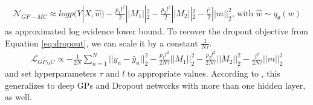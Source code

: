 \documentclass[a4paper,cleardoubleempty,BCOR1cm, 11pt]{report}
\begin{document}
\begin{align*}
\mathcal{N}_{GP-MC} \approx log p(Y|X, \hat{w}) - \frac{p_1 l^2}{2} ||M_1||^2_2 - \frac{p_2 l^2}{2}||M_2||^2_2 - \frac{l^2}{2}||m||^2_2 \text{, with } \hat{w} \sim q_{\theta}(w)
\end{align*}
as approximated log evidence lower bound.
To recover the dropout objective from Equation \ref{eq:dropout}, we can scale it by a constant $\frac{1}{N \tau}$.
\begin{align*}
\mathcal{L}_{GP_MC} \propto  - \frac{1}{2N} \sum_{n=1}^N ||y_n - \hat{y}_n||^2_2 -  \frac{p_1 l^2}{2N\tau} ||M_1||^2_2 - \frac{p_2 l^2}{2N\tau}||M_2||^2_2 - \frac{l^2}{2N\tau}||m||^2_2
\end{align*}
and set hyperparameters $\tau$ and $l$ to appropriate values. According to \citet{gal2016dropout}, this generalizes to deep GPs and Dropout networks with more than one hidden layer, as well.
\end{document}
